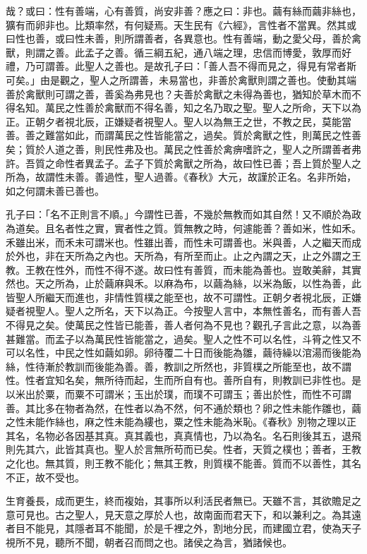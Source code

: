 哉？或曰：性有善端，心有善質，尚安非善？應之曰：非也。繭有絲而繭非絲也，獷有而卵非也。比類率然，有何疑焉。天生民有《六經》，言性者不當異。然其或曰性也善，或曰性未善，則所謂善者，各異意也。性有善端，動之愛父母，善於禽獸，則謂之善。此孟子之善。循三綱五紀，通八端之理，忠信而博愛，敦厚而好禮，乃可謂善。此聖人之善也。是故孔子曰：「善人吾不得而見之，得見有常者斯可矣。」由是觀之，聖人之所謂善，未易當也，非善於禽獸則謂之善也。使動其端善於禽獸則可謂之善，善奚為弗見也？夫善於禽獸之未得為善也，猶知於草木而不得名知。萬民之性善於禽獸而不得名善，知之名乃取之聖。聖人之所命，天下以為正。正朝夕者視北辰，正嫌疑者視聖人。聖人以為無王之世，不教之民，莫能當善。善之難當如此，而謂萬民之性皆能當之，過矣。質於禽獸之性，則萬民之性善矣；質於人道之善，則民性弗及也。萬民之性善於禽痹嗜許之，聖人之所謂善者弗許。吾質之命性者異孟子。孟子下質於禽獸之所為，故曰性已善；吾上質於聖人之所為，故謂性未善。善過性，聖人過善。《春秋》大元，故謹於正名。名非所始，如之何謂未善已善也。



孔子曰：「名不正則言不順。」今謂性已善，不幾於無教而如其自然！又不順於為政為道矣。且名者性之實，實者性之質。質無教之時，何遽能善？善如米，性如禾。禾雖出米，而禾未可謂米也。性雖出善，而性未可謂善也。米與善，人之繼天而成於外也，非在天所為之內也。天所為，有所至而止。止之內謂之天，止之外謂之王教。王教在性外，而性不得不遂。故曰性有善質，而未能為善也。豈敢美辭，其實然也。天之所為，止於繭麻與禾。以麻為布，以繭為絲，以米為飯，以性為善，此皆聖人所繼天而進也，非情性質樸之能至也，故不可謂性。正朝夕者視北辰，正嫌疑者視聖人。聖人之所名，天下以為正。今按聖人言中，本無性善名，而有善人吾不得見之矣。使萬民之性皆已能善，善人者何為不見也？觀孔子言此之意，以為善甚難當。而孟子以為萬民性皆能當之，過矣。聖人之性不可以名性，斗筲之性又不可以名性，中民之性如繭如卵。卵待覆二十日而後能為雛，繭待繰以涫湯而後能為絲，性待漸於教訓而後能為善。善，教訓之所然也，非質樸之所能至也，故不謂性。性者宜知名矣，無所待而起，生而所自有也。善所自有，則教訓已非性也。是以米出於粟，而粟不可謂米；玉出於璞，而璞不可謂玉；善出於性，而性不可謂善。其比多在物者為然，在性者以為不然，何不通於類也？卵之性未能作雛也，繭之性未能作絲也，麻之性未能為縷也，粟之性未能為米恥。《春秋》別物之理以正其名，名物必各因基其真。真其義也，真真情也，乃以為名。名石則後其五，退飛則先其六，此皆其真也。聖人於言無所苟而已矣。性者，天質之樸也；善者，王教之化也。無其質，則王教不能化；無其王教，則質樸不能善。質而不以善性，其名不正，故不受也。


生育養長，成而更生，終而複始，其事所以利活民者無已。天雖不言，其欲贍足之意可見也。古之聖人，見天意之厚於人也，故南面而君天下，和以兼利之。為其遠者目不能見，其隱者耳不能聞，於是千裡之外，割地分民，而建國立君，使為天子視所不見，聽所不聞，朝者召而問之也。諸侯之為言，猶諸候也。

